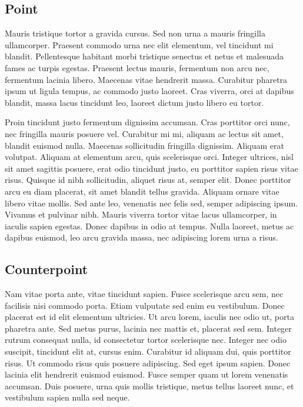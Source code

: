 \documentclass[9pt]{memoir}
\begin{document}
\subsection{Point}
Mauris tristique tortor a gravida cursus. Sed non urna a mauris fringilla ullamcorper. Praesent commodo urna nec elit elementum, vel tincidunt mi blandit. Pellentesque habitant morbi tristique senectus et netus et malesuada fames ac turpis egestas. Praesent lectus mauris, fermentum non arcu nec, fermentum lacinia libero. Maecenas vitae hendrerit massa. Curabitur pharetra ipsum ut ligula tempus, ac commodo justo laoreet. Cras viverra, orci at dapibus blandit, massa lacus tincidunt leo, laoreet dictum justo libero eu tortor.

Proin tincidunt justo fermentum dignissim accumsan. Cras porttitor orci nunc, nec fringilla mauris posuere vel. Curabitur mi mi, aliquam ac lectus sit amet, blandit euismod nulla. Maecenas sollicitudin fringilla dignissim. Aliquam erat volutpat. Aliquam at elementum arcu, quis scelerisque orci. Integer ultrices, nisl sit amet sagittis posuere, erat odio tincidunt justo, eu porttitor sapien risus vitae risus. Quisque id nibh sollicitudin, aliquet risus at, semper elit. Donec porttitor arcu eu diam placerat, sit amet blandit tellus gravida. Aliquam ornare vitae libero vitae mollis. Sed ante leo, venenatis nec felis sed, semper adipiscing ipsum. Vivamus et pulvinar nibh. Mauris viverra tortor vitae lacus ullamcorper, in iaculis sapien egestas. Donec dapibus in odio at tempus. Nulla laoreet, metus ac dapibus euismod, leo arcu gravida massa, nec adipiscing lorem urna a risus.

\subsection{Counterpoint}
Nam vitae porta ante, vitae tincidunt sapien. Fusce scelerisque arcu sem, nec facilisis nisi commodo porta. Etiam vulputate sed enim eu vestibulum. Donec placerat est id elit elementum ultricies. Ut arcu lorem, iaculis nec odio ut, porta pharetra ante. Sed metus purus, lacinia nec mattis et, placerat sed sem. Integer rutrum consequat nulla, id consectetur tortor scelerisque nec. Integer nec odio suscipit, tincidunt elit at, cursus enim. Curabitur id aliquam dui, quis porttitor risus. Ut commodo risus quis posuere adipiscing. Sed eget ipsum sapien. Donec lacinia elit hendrerit euismod euismod. Fusce semper quam ut lorem venenatis accumsan. Duis posuere, urna quis mollis tristique, metus tellus laoreet nunc, et vestibulum sapien nulla sed neque.
\end{document}
